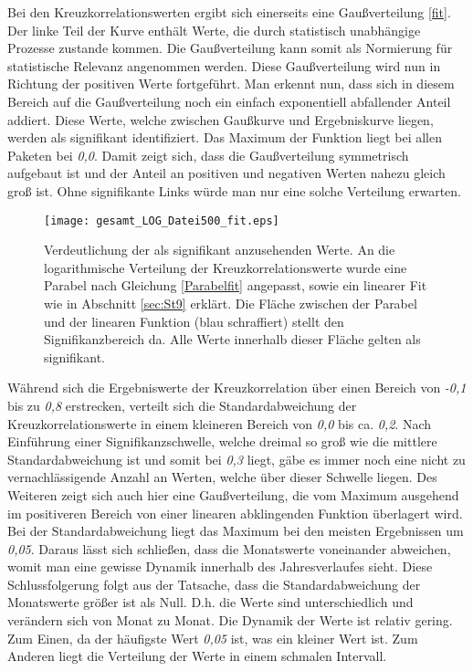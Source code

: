 \documentclass[fontsize=11pt, twoside, a4paper]{scrartcl}
\begin{document}
Bei den Kreuzkorrelationswerten ergibt sich einerseits eine Gaußverteilung \ref{fit}. Der linke Teil der Kurve enthält Werte, die durch statistisch unabhängige Prozesse zustande kommen. Die Gaußverteilung kann somit als Normierung für statistische Relevanz angenommen werden. Diese Gaußverteilung wird nun in Richtung der positiven Werte fortgeführt. Man erkennt nun, dass sich in diesem Bereich auf die Gaußverteilung noch ein einfach exponentiell abfallender Anteil addiert. Diese Werte, welche zwischen Gaußkurve und Ergebniskurve liegen, werden als signifikant identifiziert. Das Maximum der Funktion liegt bei allen Paketen bei \textit{0,0}. Damit zeigt sich, dass die Gaußverteilung symmetrisch aufgebaut ist und der Anteil an positiven und negativen Werten nahezu gleich groß ist. Ohne signifikante Links würde man nur eine solche Verteilung erwarten.\\
\begin{figure}[H]
	\centering
		\texttt{[image: gesamt\_LOG\_Datei500\_fit.eps]}
		\label{fit}
\caption{Verdeutlichung der als signifikant anzusehenden Werte. An die logarithmische Verteilung der Kreuzkorrelationswerte wurde eine Parabel nach Gleichung \ref{Parabelfit} angepasst, sowie ein linearer Fit wie in Abschnitt \ref{sec:St9} erklärt. Die Fläche zwischen der Parabel und der linearen Funktion (blau schraffiert) stellt den Signifikanzbereich da. Alle Werte innerhalb dieser Fläche gelten als signifikant.}
\label{gefittetesBild}
\end{figure}
Während sich die Ergebniswerte der Kreuzkorrelation über einen Bereich von \textit{-0,1} bis zu \textit{0,8} erstrecken, verteilt sich die Standardabweichung der Kreuzkorrelationswerte in einem kleineren Bereich von \textit{0,0} bis ca. \textit{0,2}. Nach Einführung einer Signifikanzschwelle, welche dreimal so groß wie die mittlere Standardabweichung ist und somit bei \textit{0,3} liegt, gäbe es immer noch eine nicht zu vernachlässigende Anzahl an Werten, welche über dieser Schwelle liegen. Des Weiteren zeigt sich auch hier eine Gaußverteilung, die vom Maximum ausgehend im positiveren Bereich von einer linearen abklingenden Funktion überlagert wird. Bei der Standardabweichung liegt das Maximum bei den meisten Ergebnissen um \textit{0,05}. Daraus lässt sich schließen, dass die Monatswerte voneinander abweichen, womit man eine gewisse Dynamik innerhalb des Jahresverlaufes sieht. Diese Schlussfolgerung folgt aus der Tatsache, dass die Standardabweichung der Monatswerte größer ist als Null. D.h. die Werte sind unterschiedlich und verändern sich von Monat zu Monat. Die Dynamik der Werte ist relativ gering. Zum Einen, da der häufigste Wert \textit{0,05} ist, was ein kleiner Wert ist. Zum Anderen liegt die Verteilung der Werte in einem schmalen Intervall.\\
\end{document}
